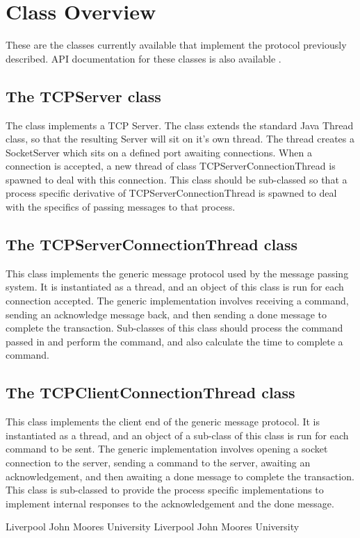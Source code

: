 \documentclass[10pt,a4paper]{article}
\begin{document}
\section{Class Overview}
These are the classes currently available that implement the protocol previously described. API documentation
for these classes is also available \cite{bib:ngatnettree}.

\subsection{The TCPServer class}
The class implements a TCP Server. The class extends the standard Java Thread class, so that the resulting Server
will sit on it's own thread. The thread creates a SocketServer which sits on a defined port awaiting connections. 
When a connection is accepted, a new thread of class TCPServerConnectionThread is spawned to deal with this connection.
This class should be sub-classed so that a process specific derivative of TCPServerConnectionThread is spawned
to deal with the specifics of passing messages to that process.

\subsection{The TCPServerConnectionThread class}
This class implements the generic message protocol used by the message passing system. It is instantiated as a thread,
and an object of this class is run for each connection accepted. The generic implementation involves receiving a 
command, sending an acknowledge message back, and then sending a done message to complete the transaction. Sub-classes
of this class should process the command passed in and perform the command, and also calculate the time to complete 
a command.

\subsection{The TCPClientConnectionThread class}
This class implements the client end of the generic message protocol. It is instantiated as a thread,
and an object of a sub-class of this class is run for each command to be sent. The generic implementation involves
opening a socket connection to the server, sending a command to the server, awaiting an acknowledgement, 
and then awaiting a done message to complete the transaction. This class is sub-classed to provide the process
specific implementations to implement internal responses to the acknowledgement and the done message.

\begin{thebibliography}{99}
Liverpool John Moores University
Liverpool John Moores University 
\end{thebibliography}
\end{document}
